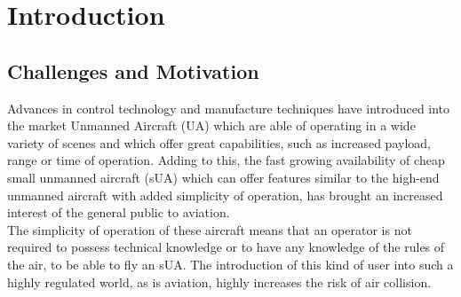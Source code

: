 
\chapter{Introduction}
\label{chapter:introduction}

\section{Challenges and Motivation}
\label{section:motivation}
Advances in control technology and manufacture techniques have introduced into the market Unmanned Aircraft (UA) which are able of operating in a wide variety of scenes and which offer great capabilities, such as increased payload, range or time of operation. Adding to this, the fast growing availability of cheap small unmanned aircraft (sUA) which can offer features similar to the high-end unmanned aircraft with added simplicity of operation, has brought an increased interest of the general public to aviation.\\
The simplicity of operation of these aircraft means that an operator is not required to possess technical knowledge or to have any knowledge of the rules of the air, to be able to fly an sUA. The introduction of this kind of user into such a highly regulated world, as is aviation, highly increases the risk of air collision.\\

